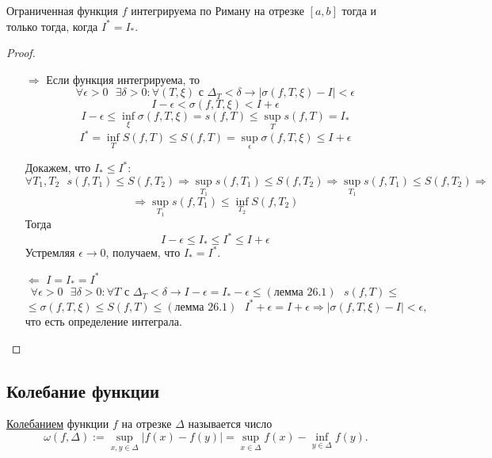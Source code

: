     \begin{theorem}
    	Ограниченная функция $f$ интегрируема по Риману на отрезке $[a, b]$ тогда и только тогда, когда $I^{*} = I_{*}$.
    \end{theorem}
    
    \begin{proof}
    	\begin{enumerate}
    		\item[$\Rightarrow$] Если функция интегрируема, то 
    		\[ \forall \epsilon > 0 \text{ } \exists \delta > 0: \forall (T, \xi) \text{ с } \Delta_T < \delta \rightarrow |\sigma(f, T, \xi) - I| < \epsilon \]
    		\[ I - \epsilon < \sigma(f, T, \xi) < I + \epsilon \]
    		\[ I - \epsilon \leqslant \inf_{\xi} {\sigma(f, T, \xi)} = s(f, T) \leqslant \sup_{T} {s(f, T)} = I_{*} \]
    		\[ I^{*} = \inf_{T} {S(f, T)} \leqslant S(f, T) = \sup_{\epsilon} {\sigma(f, T, \xi)} \leqslant I + \epsilon \]
    		
    		Докажем, что $I_{*} \leqslant I^{*}$:
    		\[ \forall T_1, T_2 \text{ } s(f, T_1) \leqslant S(f, T_2) \Rightarrow \sup_{T_1} {s(f, T_1)} \leqslant S(f, T_2) \Rightarrow \sup_{T_1} {s(f, T_1)} \leqslant S(f, T_2) \Rightarrow \]
    		\[ \Rightarrow \sup_{T_1} {s(f, T_1)} \leqslant \inf_{T_2} {S(f, T_2)} \]
    		Тогда
    		\[ I - \epsilon \leqslant I_{*} \leqslant I^{*} \leqslant I + \epsilon \]
    		Устремляя $\epsilon \to 0$, получаем, что $I_{*} = I^{*}$.
    		\item[$\Leftarrow$] $I = I_{*} = I^{*}$
    		\[ \forall \epsilon > 0 \text{ } \exists \delta > 0 : \forall T \text{ с } \Delta_T < \delta \rightarrow I - \epsilon = I_{*} - \epsilon \leqslant (\text{лемма 26.1}) \text{ } s(f, T) \leqslant \]
    		\[ \leqslant \sigma(f, T, \xi) \leqslant S(f, T) \leqslant (\text{лемма 26.1}) \text{ } I^{*} + \epsilon = I + \epsilon \Rightarrow |\sigma(f, T, \xi) - I| < \epsilon, \]
    		что есть определение интеграла.
    	\end{enumerate}
    \end{proof}
    
    \subsection{Колебание функции}
    
    \begin{definition}
    	\underline{Колебанием} функции $f$ на отрезке $\Delta$ называется число
    	\[ \omega(f, \Delta) := \sup_{x, y \in \Delta}{|f(x) - f(y)|} = \sup_{x \in \Delta}{f(x)} - \inf_{y \in \Delta}{f(y)}. \]
    \end{definition}
    
